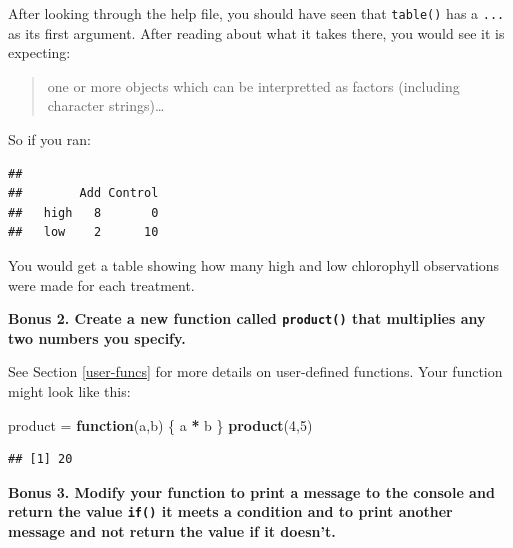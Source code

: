\documentclass[]{book}
\newenvironment{Shaded}{\begin{snugshade}}{\end{snugshade}}
\newcommand{\KeywordTok}[1]{\textcolor[rgb]{0.13,0.29,0.53}{\textbf{#1}}}
\newcommand{\DecValTok}[1]{\textcolor[rgb]{0.00,0.00,0.81}{#1}}
\newcommand{\StringTok}[1]{\textcolor[rgb]{0.31,0.60,0.02}{#1}}
\newcommand{\ControlFlowTok}[1]{\textcolor[rgb]{0.13,0.29,0.53}{\textbf{#1}}}
\newcommand{\OperatorTok}[1]{\textcolor[rgb]{0.81,0.36,0.00}{\textbf{#1}}}
\newcommand{\NormalTok}[1]{#1}
\theoremstyle{definition}
\theoremstyle{definition}
\theoremstyle{definition}
\theoremstyle{remark}
\begin{document}
After looking through the help file, you should have seen that
\texttt{table()} has a \texttt{...} as its first argument. After reading
about what it takes there, you would see it is expecting:

\begin{quote}
one or more objects which can be interpretted as factors (including
character strings)\ldots{}
\end{quote}

So if you ran:

\begin{Shaded}
\end{Shaded}

\begin{verbatim}
##       
##        Add Control
##   high   8       0
##   low    2      10
\end{verbatim}

You would get a table showing how many high and low chlorophyll
observations were made for each treatment.

\textbf{Bonus 2. Create a new function called \texttt{product()} that
multiplies any two numbers you specify.}

See Section \ref{user-funcs} for more details on user-defined functions.
Your function might look like this:

\begin{Shaded}
\begin{Highlighting}[]
\NormalTok{product =}\StringTok{ }\ControlFlowTok{function}\NormalTok{(a,b) \{}
\NormalTok{  a }\OperatorTok{*}\StringTok{ }\NormalTok{b}
\NormalTok{\}}
\KeywordTok{product}\NormalTok{(}\DecValTok{4}\NormalTok{,}\DecValTok{5}\NormalTok{)}
\end{Highlighting}
\end{Shaded}

\begin{verbatim}
## [1] 20
\end{verbatim}

\textbf{Bonus 3. Modify your function to print a message to the console
and return the value \texttt{if()} it meets a condition and to print
another message and not return the value if it doesn't.}
\end{document}
